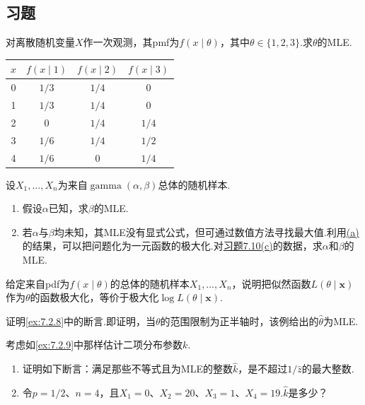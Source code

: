 \subsection{习题}\label{sec:7.4}
\begin{exercise}\label{exercise:7.1}
对离散随机变量$X$作一次观测，其pmf为$f(x\mid\theta)$，其中$\theta\in\{1,2,3\}$.求$\theta$的MLE.
\begin{center}\begin{tabular}{cccc}
$x$&$f(x\mid1)$&$f(x\mid2)$&$f(x\mid3)$\\\hline
0&$1/3$&$1/4$&0\\
1&$1/3$&$1/4$&0\\
2&0&$1/4$&$1/4$\\
3&$1/6$&$1/4$&$1/2$\\
4&$1/6$&0&$1/4$
\end{tabular}\end{center}
\end{exercise}
\begin{exercise}\label{exercise:7.2}
设$X_1,\ldots,X_n$为来自$\operatorname{gamma}(\alpha,\beta)$总体的随机样本.
\begin{enumerate}[label=(\alph*)]
\item{}\label{itm:exercise:7.2:a} 假设$\alpha$已知，求$\beta$的MLE.
\item 若$\alpha$与$\beta$均未知，其MLE没有显式公式，但可通过数值方法寻找最大值.利用\hyperref[itm:exercise:7.2:a]{(a)}的结果，可以把问题化为一元函数的极大化.对\hyperref[itm:exercise:7.10:c]{习题7.10(c)}的数据，求$\alpha$和$\beta$的MLE.
\end{enumerate}
\end{exercise}
\begin{exercise}\label{exercise:7.3}
给定来自pdf为$f(x\mid\theta)$的总体的随机样本$X_1,\ldots,X_n$，说明把似然函数$L(\theta\mid\boldsymbol x)$作为$\theta$的函数极大化，等价于极大化$\log L(\theta\mid\boldsymbol x)$.
\end{exercise}
\begin{exercise}\label{exercise:7.4}
证明\autoref{ex:7.2.8}中的断言.即证明，当$\theta$的范围限制为正半轴时，该例给出的$\widehat\theta$为MLE.
\end{exercise}
\begin{exercise}\label{exercise:7.5}
考虑如\autoref{ex:7.2.9}中那样估计二项分布参数$k$.
\begin{enumerate}[label=(\alph*)]
\item 证明如下断言：满足那些不等式且为MLE的整数$\widehat k$，是不超过$1/\widehat z$的最大整数.
\item 令$p=1/2$、$n=4$，且$X_1=0$、$X_2=20$、$X_3=1$、$X_4=19$.$\widehat k$是多少？
\end{enumerate}
\end{exercise}
